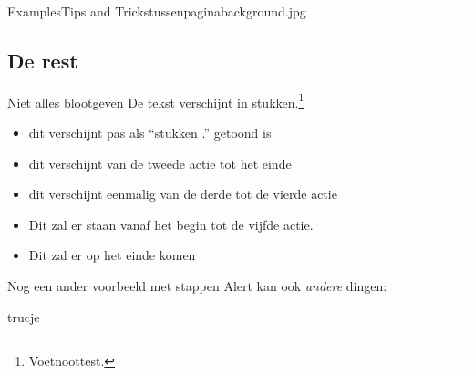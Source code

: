 \documentclass[department=ds, notes={show notes}, slidesperpage=4, handout, official=true]{beamerruhuisstijl}
\begin{document}

\renewcommand{\dept}{cls}

\begin{tussenpagina}{Examples}{Tips and Tricks}{tussenpaginabackground.jpg}
\end{tussenpagina}
\note{}

\subsection{De rest}
\begin{frame}{Niet alles blootgeven}
    De \pause tekst \pause verschijnt \pause in \pause stukken.\footnote{Voetnoottest.}

    \begin{itemize}
         \item<+-> dit verschijnt pas als ``stukken .'' getoond is
         \item<+-> dit verschijnt van de tweede actie tot het einde
         \item<+-+> dit verschijnt eenmalig van de derde tot de vierde actie
         \item<-+> Dit zal er staan vanaf het begin tot de vijfde actie.
         \item<+-> Dit zal er op het einde komen 
      \end{itemize}
\end{frame}

\begin{frame}{Nog een ander voorbeeld met stappen}
    Alert kan \alert<+->{ook}
    \emph<+->{andere} dingen:
     
    trucje
\end{frame}
\note{
    
}
\end{document}
